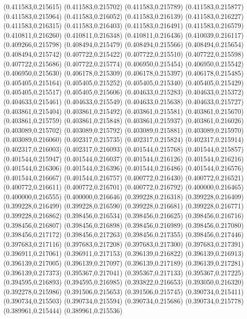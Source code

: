 (0.411583,0.215615)
(0.411583,0.215702)
(0.411583,0.215789)
(0.411583,0.215877)
(0.411583,0.215964)
(0.411583,0.216052)
(0.411583,0.216139)
(0.411583,0.216227)
(0.411583,0.216315)
(0.411583,0.216403)
(0.411583,0.216491)
(0.411583,0.216579)
(0.410811,0.216260)
(0.410811,0.216348)
(0.410811,0.216436)
(0.410039,0.216117)
(0.409266,0.215798)
(0.408494,0.215479)
(0.408494,0.215566)
(0.408494,0.215654)
(0.408494,0.215742)
(0.407722,0.215422)
(0.407722,0.215510)
(0.407722,0.215598)
(0.407722,0.215686)
(0.407722,0.215774)
(0.406950,0.215454)
(0.406950,0.215542)
(0.406950,0.215630)
(0.406178,0.215309)
(0.406178,0.215397)
(0.406178,0.215485)
(0.405405,0.215164)
(0.405405,0.215252)
(0.405405,0.215340)
(0.405405,0.215429)
(0.405405,0.215517)
(0.405405,0.215606)
(0.404633,0.215283)
(0.404633,0.215372)
(0.404633,0.215461)
(0.404633,0.215549)
(0.404633,0.215638)
(0.404633,0.215727)
(0.403861,0.215404)
(0.403861,0.215492)
(0.403861,0.215581)
(0.403861,0.215670)
(0.403861,0.215759)
(0.403861,0.215848)
(0.403861,0.215937)
(0.403861,0.216026)
(0.403089,0.215702)
(0.403089,0.215792)
(0.403089,0.215881)
(0.403089,0.215970)
(0.403089,0.216060)
(0.402317,0.215735)
(0.402317,0.215824)
(0.402317,0.215914)
(0.402317,0.216003)
(0.402317,0.216093)
(0.401544,0.215768)
(0.401544,0.215857)
(0.401544,0.215947)
(0.401544,0.216037)
(0.401544,0.216126)
(0.401544,0.216216)
(0.401544,0.216306)
(0.401544,0.216396)
(0.401544,0.216486)
(0.401544,0.216576)
(0.401544,0.216667)
(0.401544,0.216757)
(0.400772,0.216430)
(0.400772,0.216521)
(0.400772,0.216611)
(0.400772,0.216701)
(0.400772,0.216792)
(0.400000,0.216465)
(0.400000,0.216555)
(0.400000,0.216646)
(0.399228,0.216318)
(0.399228,0.216409)
(0.399228,0.216499)
(0.399228,0.216590)
(0.399228,0.216681)
(0.399228,0.216771)
(0.399228,0.216862)
(0.398456,0.216534)
(0.398456,0.216625)
(0.398456,0.216716)
(0.398456,0.216807)
(0.398456,0.216898)
(0.398456,0.216989)
(0.398456,0.217080)
(0.398456,0.217172)
(0.398456,0.217263)
(0.398456,0.217355)
(0.398456,0.217446)
(0.397683,0.217116)
(0.397683,0.217208)
(0.397683,0.217300)
(0.397683,0.217391)
(0.396911,0.217061)
(0.396911,0.217153)
(0.396139,0.216822)
(0.396139,0.216913)
(0.396139,0.217005)
(0.396139,0.217097)
(0.396139,0.217189)
(0.396139,0.217281)
(0.396139,0.217373)
(0.395367,0.217041)
(0.395367,0.217133)
(0.395367,0.217225)
(0.394595,0.216893)
(0.394595,0.216985)
(0.393822,0.216653)
(0.393050,0.216320)
(0.392278,0.215986)
(0.391506,0.215653)
(0.391506,0.215745)
(0.390734,0.215411)
(0.390734,0.215503)
(0.390734,0.215594)
(0.390734,0.215686)
(0.390734,0.215778)
(0.389961,0.215444)
(0.389961,0.215536)

